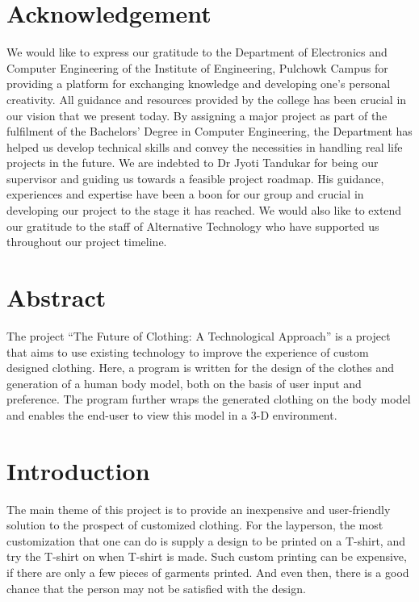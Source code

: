 \documentclass{article}
\begin{document}
    \section*{Acknowledgement}
We would like to express our gratitude to the Department of Electronics and Computer Engineering of the Institute of Engineering, Pulchowk Campus for providing a platform for exchanging knowledge and developing one’s personal creativity. All guidance and resources provided by the college has been crucial in our vision that we present today. By assigning a major project as part of the fulfilment of the Bachelors’ Degree in Computer Engineering, the Department has helped us develop technical skills and convey the necessities in handling real life projects in the future.
We are indebted to Dr Jyoti Tandukar for being our supervisor and guiding us towards a feasible project roadmap. His guidance, experiences and expertise have been a boon for our group and crucial in developing our project to the stage it has reached. We would also like to extend our gratitude to the staff of Alternative Technology who have supported us throughout our project timeline.



\newpage

\section*{Abstract}
The project “The Future of Clothing: A Technological Approach” is a project that aims to use existing technology to improve the experience of custom designed clothing. Here, a program is written for the design of the clothes and generation of a human body model, both on the basis of user input and preference. The program further wraps the generated clothing on the body model and enables the end-user to view this model in a 3-D environment.
\newpage

\tableofcontents
\listoffigures


\newpage
{}
\section{Introduction}

The main theme of this project is to provide an inexpensive and user-friendly solution to the prospect of customized clothing. For the layperson, the most customization that one can do is supply a design to be printed on a T-shirt, and try the T-shirt on when T-shirt is made. Such custom printing can be expensive, if there are only a few pieces of garments printed. And even then, there is a good chance that the person may not be satisfied with the design. 
\end{document}
